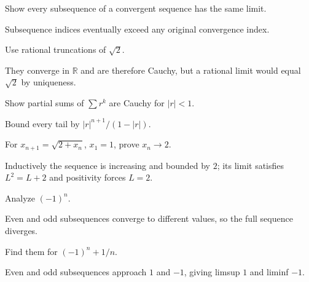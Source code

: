 \begin{problem}\label{prob:ii03-problem-04}
Show every subsequence of a convergent sequence has the same limit.
\end{problem}
\begin{solution}
Subsequence indices eventually exceed any original convergence index.
\end{solution}

\begin{problem}\label{prob:ii03-problem-05}
Use rational truncations of $\sqrt2$.
\end{problem}
\begin{solution}
They converge in $\mathbb R$ and are therefore Cauchy, but a rational limit would equal $\sqrt2$ by uniqueness.
\end{solution}

\begin{problem}\label{prob:ii03-problem-06}
Show partial sums of $\sum r^k$ are Cauchy for $|r|<1$.
\end{problem}
\begin{solution}
Bound every tail by $|r|^{n+1}/(1-|r|)$.
\end{solution}

\begin{problem}\label{prob:ii03-problem-07}
For $x_{n+1}=\sqrt{2+x_n}$, $x_1=1$, prove $x_n\to2$.
\end{problem}
\begin{solution}
Inductively the sequence is increasing and bounded by $2$; its limit satisfies $L^2=L+2$ and positivity forces $L=2$.
\end{solution}

\begin{problem}\label{prob:ii03-problem-08}
Analyze $(-1)^n$.
\end{problem}
\begin{solution}
Even and odd subsequences converge to different values, so the full sequence diverges.
\end{solution}

\begin{problem}\label{prob:ii03-problem-09}
Find them for $(-1)^n+1/n$.
\end{problem}
\begin{solution}
Even and odd subsequences approach $1$ and $-1$, giving limsup $1$ and liminf $-1$.
\end{solution}

